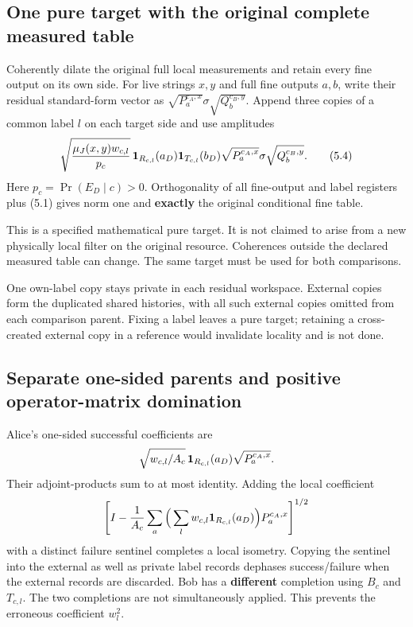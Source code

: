 \documentclass[11pt,reqno]{amsart}
\numberwithin{equation}{section}
\begin{document}
\subsection{One pure target with the original complete measured table}\label{one-pure-target-with-the-original-complete-measured-table}

Coherently dilate the original full local measurements and retain every fine output on its own side. For live strings \(x,y\) and full fine outputs \(a,b\), write their residual standard-form vector as \(\sqrt{P_a^{c_A,x}}\sigma\sqrt{Q_b^{c_B,y}}\). Append three copies of a common label \(l\) on each target side and use amplitudes \[
 \sqrt{\frac{\mu_J(x,y)w_{c,l}}{p_c}}\,
 {\bf1}_{R_{c,l}}(a_D){\bf1}_{T_{c,l}}(b_D)
 \sqrt{P_a^{c_A,x}}\sigma\sqrt{Q_b^{c_B,y}}. \tag{5.4}
\] Here \(p_c=\Pr(E_D\mid c)>0\). Orthogonality of all fine-output and label registers plus (5.1) gives norm one and \textbf{exactly} the original conditional fine table.

This is a specified mathematical pure target. It is not claimed to arise from a new physically local filter on the original resource. Coherences outside the declared measured table can change. The same target must be used for both comparisons.

One own-label copy stays private in each residual workspace. External copies form the duplicated shared histories, with all such external copies omitted from each comparison parent. Fixing a label leaves a pure target; retaining a cross-created external copy in a reference would invalidate locality and is not done.

\subsection{Separate one-sided parents and positive operator-matrix domination}\label{separate-one-sided-parents-and-positive-operator-matrix-domination}

Alice's one-sided successful coefficients are \[
 \sqrt{w_{c,l}/A_c}\,
 {\bf1}_{R_{c,l}}(a_D)\sqrt{P_a^{c_A,x}}.
\] Their adjoint-products sum to at most identity. Adding the local coefficient \[
 \left[I-\frac1{A_c}\sum_a
       \Big(\sum_lw_{c,l}{\bf1}_{R_{c,l}}(a_D)\Big)P_a^{c_A,x}\right]^{1/2}
\] with a distinct failure sentinel completes a local isometry. Copying the sentinel into the external as well as private label records dephases success/failure when the external records are discarded. Bob has a \textbf{different} completion using \(B_c\) and \(T_{c,l}\). The two completions are not simultaneously applied. This prevents the erroneous coefficient \(w_l^2\).
\end{document}
